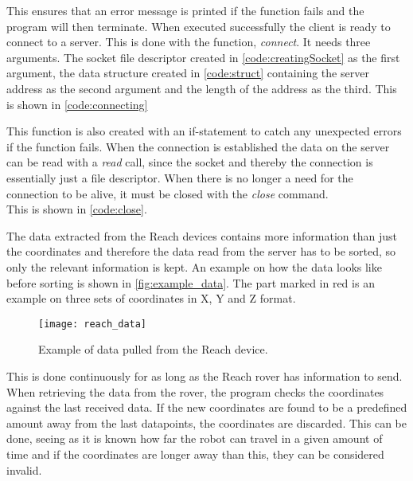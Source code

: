 
This ensures that an error message is printed if the function fails and the program will then terminate. When executed successfully the client is ready to connect to a server. This is done with the function, \textit{connect}. It needs three arguments. The socket file descriptor created in \autoref{code:creatingSocket} as the first argument, the data structure created in \autoref{code:struct} containing the server address as the second argument and the length of the address as the third. This is shown in \autoref{code:connecting}


This function is also created with an if-statement to catch any unexpected errors if the function fails. When the connection is established the data on the server can be read with a \textit{read} call, since the socket and thereby the connection is essentially just a file descriptor. When there is no longer a need for the connection to be alive, it must be closed with the \textit{close} command.\\ This is shown in \autoref{code:close}.
\newpage
{}

The data extracted from the Reach devices contains more information than just the coordinates and therefore the data read from the server has to be sorted, so only the relevant information is kept. An example on how the data looks like before sorting is shown in \autoref{fig:example_data}. The part marked in red is an example on three sets of coordinates in X, Y and Z format.

\begin{figure}[h]%
\centering
\texttt{[image: reach\_data]}%
\caption{Example of data pulled from the Reach device. }%
\label{fig:example_data}%
\end{figure}

This is done continuously for as long as the Reach rover has information to send. When retrieving the data from the rover, the program checks the coordinates against the last received data. If the new coordinates are found to be a predefined amount away from the last datapoints, the coordinates are discarded. This can be done, seeing as it is known how far the robot can travel in a given amount of time and if the coordinates are longer away than this, they can be considered invalid. %

